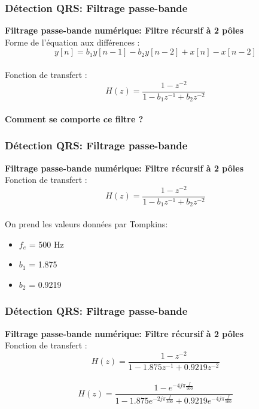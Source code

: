 \documentclass{beamer}
\begin{document}
\begin{frame}
\frametitle{Détection QRS: Filtrage passe-bande}
 \textbf{Filtrage passe-bande numérique: Filtre récursif à  2 pôles}\\

  Forme de l'équation aux différences :
 \[y[n] = b_1 y[n-1] - b_2 y[n-2] + x[n] - x[n-2] \]  \\
  \vspace{0.3 cm}
  Fonction de transfert :
   \[H(z) = \frac{1 - z^{-2}}{1 - b_1 z^{-1} + b_2 z^{-2}} \]  \\
  \vspace{0.3cm}
 \textbf{Comment se comporte ce filtre ?}
\end{frame}

\begin{frame}
\frametitle{Détection QRS: Filtrage passe-bande}
 \textbf{Filtrage passe-bande numérique: Filtre récursif à  2 pôles}\\

  \vspace{0.3 cm}
  Fonction de transfert :
   \[H(z) = \frac{1 - z^{-2}}{1 - b_1 z^{-1} + b_2 z^{-2}} \]  \\
  \vspace{0.3cm}
 On prend les valeurs données par Tompkins:
 \begin{itemize}
 \item $f_e$ = 500 Hz
 \item $b_1$ = 1.875
 \item $b_2$ = 0.9219
 \end{itemize}
\end{frame}

\begin{frame}
\frametitle{Détection QRS: Filtrage passe-bande}
 \textbf{Filtrage passe-bande numérique: Filtre récursif à  2 pôles}\\

  \vspace{0.3 cm}
  Fonction de transfert :
   \[H(z) = \frac{1 - z^{-2}}{1 - 1.875 z^{-1} + 0.9219 z^{-2}} \]  \\
  \vspace{0.3cm}
   \[H(z) = \frac{1 - e^{-4 j \pi \frac{f}{500}}}{1 - 1.875 e^{-2 j \pi \frac{f}{500}} + 0.9219  e^{-4 j \pi \frac{f}{500}}} \] 

\end{frame}
\end{document}
